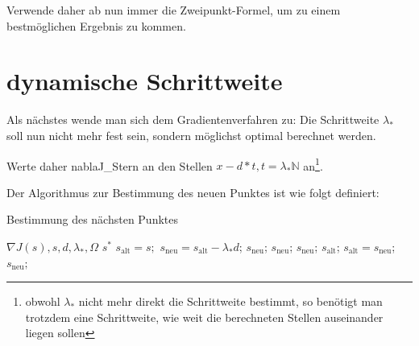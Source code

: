 \documentclass[a4paper,12pt]{report}
\newcommand{\N}{\mathbb N}
\newcommand{\1}{\mathds{1}}
\theoremstyle{plain} %
\theoremstyle{definition} %
\theoremstyle{remark}
\begin{document}
            Verwende daher ab nun immer die Zweipunkt-Formel, um zu einem bestmöglichen Ergebnis zu kommen.

      \section{dynamische Schrittweite}
            Als nächstes wende man sich dem Gradientenverfahren zu:
            Die Schrittweite $\lambda_*$ soll nun nicht mehr fest sein, sondern möglichst optimal berechnet werden.

            Werte daher nablaJ\_Stern an den Stellen $x-d*t, t=\lambda_*\N$ an\footnote{obwohl $\lambda_*$ nicht mehr direkt die Schrittweite bestimmt, so benötigt man trotzdem eine Schrittweite, wie weit die berechneten Stellen auseinander liegen sollen}.

            Der Algorithmus zur Bestimmung des neuen Punktes ist wie folgt definiert:
            \begin{algorithm}
                  \caption{Bestimmung des nächsten Punktes}
                  \label{alg: dynamischerPunkt}

                  \begin{algorithmic}
                        \Require $\nabla J(s), s, d, \lambda_*, \Omega$
                        \Ensure $s^*$
                        \State $s_{\text{alt}} = s;$
                              \State $s_{\text{neu}} = s_{\text{alt}}-\lambda_* d$;
                                    \State\Return $s_{\text{neu}}$;
                                    \State\Return $s_{\text{neu}}$;
                                          \State\Return $s_{\text{neu}}$;
                                    \Else
                                          \State\Return $s_{\text{alt}}$;
                                    \EndIf
                              \EndIf
                              \State $s_{\text{alt}} = s_{\text{neu}}$;
                        \EndFor
                  \State\Return $s_{\text{neu}};$
                  \end{algorithmic}
            \end{algorithm}
\end{document}
